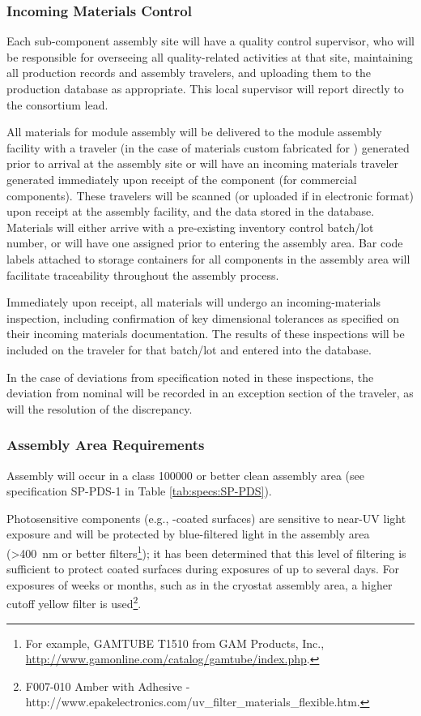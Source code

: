 \subsubsection{Incoming Materials Control}

Each  sub-component assembly site will have a quality control supervisor, who will be responsible for overseeing all quality-related activities at that site, maintaining all production records and assembly travelers, and uploading them to the production database as appropriate.   This local supervisor will report directly to the  consortium lead.

All materials for  module assembly will be delivered to the  module assembly facility with a  traveler (in the case of materials custom fabricated for ) generated prior to arrival at the assembly site or will have an incoming materials traveler generated immediately upon receipt of the component (for commercial components).  These travelers will be scanned (or uploaded if in electronic format) upon receipt at the assembly facility, and the data stored in the   database.  Materials will either arrive with a pre-existing  inventory control batch/lot number, or will have one assigned prior to entering the assembly area.  Bar code labels attached to storage containers for all components in the assembly area will facilitate traceability throughout the assembly process.

Immediately upon receipt, all materials will undergo an incoming-materials inspection, including confirmation of key dimensional tolerances as specified on their incoming materials documentation.  
The results of these inspections will be included on the traveler for that batch/lot and entered into the database.

In the case of deviations from specification noted in these inspections, the deviation from nominal will be recorded in an exception section of the traveler, as will the resolution of the discrepancy.

\subsubsection{Assembly Area Requirements}

Assembly will occur in a class \num{100000} or better clean assembly area (see specification SP-PDS-1 in Table \ref{tab:specs:SP-PDS}).  

Photosensitive components (e.g., -coated surfaces) are sensitive to near-UV light exposure and will be protected by blue-filtered light in the assembly area (>\SI{400}{nm} or better filters\footnote{For example, GAMTUBE T1510\texttrademark{} from GAM Products, Inc., \url{http://www.gamonline.com/catalog/gamtube/index.php}.}); it has been determined that this level of filtering is sufficient to protect coated surfaces during  exposures of up to several days. For exposures of weeks or months, such as in the  cryostat assembly area, a higher cutoff yellow filter is used\footnote{F007-010\texttrademark{} Amber with Adhesive - http://www.epakelectronics.com/uv\_filter\_materials\_flexible.htm.}. 

